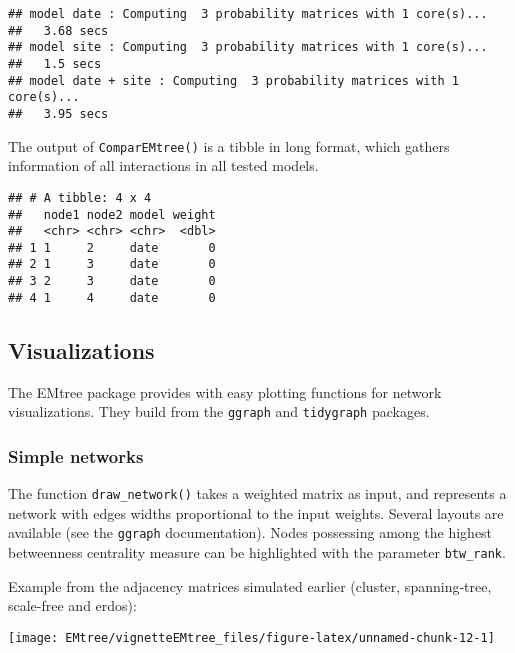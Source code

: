 \begin{verbatim}
## model date : Computing  3 probability matrices with 1 core(s)... 
##   3.68 secs
## model site : Computing  3 probability matrices with 1 core(s)... 
##   1.5 secs
## model date + site : Computing  3 probability matrices with 1 core(s)... 
##   3.95 secs
\end{verbatim}

The output of \texttt{ComparEMtree()} is a tibble in long format, which
gathers information of all interactions in all tested models.

\begin{Shaded}
\begin{Highlighting}[]
\NormalTok{)}
\end{Highlighting}
\end{Shaded}

\begin{verbatim}
## # A tibble: 4 x 4
##   node1 node2 model weight
##   <chr> <chr> <chr>  <dbl>
## 1 1     2     date       0
## 2 1     3     date       0
## 3 2     3     date       0
## 4 1     4     date       0
\end{verbatim}

\subsection{Visualizations}\label{visuals}

The EMtree package provides with easy plotting functions for network
visualizations. They build from the \texttt{ggraph} and
\texttt{tidygraph} packages.

\subsubsection{Simple networks}\label{simple-networks}

The function \texttt{draw\_network()} takes a weighted matrix as input,
and represents a network with edges widths proportional to the input
weights. Several layouts are available (see the \texttt{ggraph}
documentation). Nodes possessing among the highest betweenness
centrality measure can be highlighted with the parameter
\texttt{btw\_rank}.

Example from the adjacency matrices simulated earlier (cluster, spanning-tree, scale-free and erdos):

\begin{center}\texttt{[image: EMtree/vignetteEMtree\_files/figure-latex/unnamed-chunk-12-1]} \end{center}

